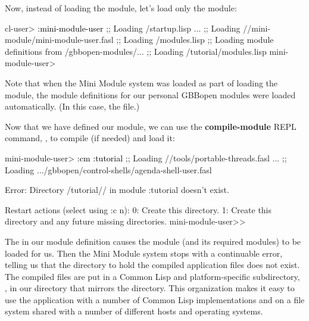 \documentclass[10pt,twoside,english,pdftex]{article}
\begin{document}
Now, instead of loading the  module, let's load only
the  module:
%
\W\supp
\begin{example}
\textcolor{darkergray}{%
  cl-user> \textcolor{black}{:mini-module-user}
  ;; Loading /startup.lisp
     ...
  ;;     Loading //mini-module/mini-module-user.fasl
  ;;   Loading /modules.lisp
  ;; Loading module definitions from /gbbopen-modules/...
  ;;     Loading /tutorial/modules.lisp
  mini-module-user>}
\end{example}
%
Note that when the Mini Module system was loaded as part of loading the
 module, the module definitions for our personal
GBBopen modules were loaded automatically.  (In this case, the
 file.)  

%
%
Now that we have defined our  module, we can use the
\textbf{compile-module} REPL command, , to compile (if needed) and
load it:
%
\W\supp
\begin{example}
\textcolor{darkergray}{%
  mini-module-user> \textcolor{black}{:cm :tutorial}
  ;;   Loading //tools/portable-threads.fasl
     ...
  ;;   Loading .../gbbopen/control-shells/agenda-shell-user.fasl

  Error: Directory /tutorial// 
         in module :tutorial doesn't exist.

  Restart actions (select using :c n):
    0: Create this directory.
    1: Create this directory and any future missing directories.
  mini-module-user>>}
\end{example}
%
The  in our  module definition causes the
 module (and its required modules) to be loaded for
us.  Then the Mini Module system stops with a continuable error, telling us
that the directory to hold the compiled application files does not exist.  The
compiled files are put in a Common Lisp and platform-specific subdirectory,
, in our  directory that mirrors
the  directory.  This organization makes it easy to use the
application with a number of Common Lisp implementations and on a file system
shared with a number of different hosts and operating systems.
\end{document}
